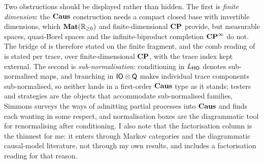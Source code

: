 Two obstructions should be displayed rather than hidden. The first is \emph{finite dimension}: the $\mathbf{Caus}$ construction needs a compact closed base with invertible dimensions, which $\mathbf{Mat}(\mathbb{R}_{\geq 0})$ and finite-dimensional $\mathbf{CP}$ provide, but measurable spaces, quasi-Borel spaces and the infinite-biproduct completion $\mathbf{CP}^{\infty}$ do not. The bridge of  is therefore stated on the finite fragment, and the comb reading of  is stated per trace, over finite-dimensional $\mathbf{CP}$, with the trace index kept external. The second is \emph{sub-normalisation}: conditioning in $L_{\mathsf{HO}}$ denotes sub-normalised maps, and branching in $\mathsf{IO}\otimes\mathsf{Q}$ makes individual trace components sub-normalised, so neither lands in a first-order $\mathbf{Caus}$ type as it stands; testers and strategies \cite{chiribella2009networks,gutoski2007games} are the objects that accommodate sub-normalised families, Simmons \cite{simmons2024thesis} surveys the ways of admitting partial processes into $\mathbf{Caus}$ and finds each wanting in some respect, and normalisation boxes \cite{jacobsszelesstein2025inference} are the diagrammatic tool for renormalising after conditioning. I also note that the factorisation column is the thinnest for me: it enters through Markov categories and the diagrammatic causal-model literature, not through my own results, and  includes a factorisation reading for that reason.

